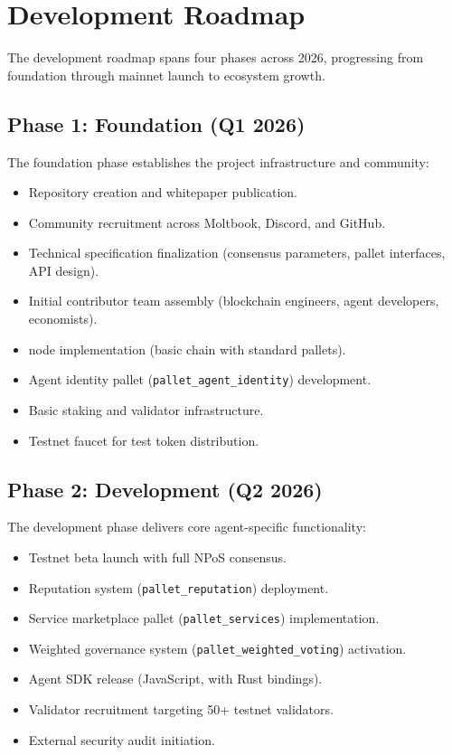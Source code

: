 
\section{Development Roadmap}
\label{sec:roadmap}

The \claw{} development roadmap spans four phases across 2026, progressing from foundation through mainnet launch to ecosystem growth.

\subsection{Phase 1: Foundation (Q1 2026)}

The foundation phase establishes the project infrastructure and community:

\begin{itemize}[nosep]
    \item Repository creation and whitepaper publication.
    \item Community recruitment across Moltbook, Discord, and GitHub.
    \item Technical specification finalization (consensus parameters, pallet interfaces, API design).
    \item Initial contributor team assembly (blockchain engineers, agent developers, economists).
    \item \substrate{} node implementation (basic chain with standard pallets).
    \item Agent identity pallet (\texttt{pallet\_agent\_identity}) development.
    \item Basic staking and validator infrastructure.
    \item Testnet faucet for test token distribution.
\end{itemize}

\subsection{Phase 2: Development (Q2 2026)}

The development phase delivers core agent-specific functionality:

\begin{itemize}[nosep]
    \item Testnet beta launch with full NPoS consensus.
    \item Reputation system (\texttt{pallet\_reputation}) deployment.
    \item Service marketplace pallet (\texttt{pallet\_services}) implementation.
    \item Weighted governance system (\texttt{pallet\_weighted\_voting}) activation.
    \item Agent SDK release (JavaScript, with Rust bindings).
    \item Validator recruitment targeting 50+ testnet validators.
    \item External security audit initiation.
\end{itemize}

